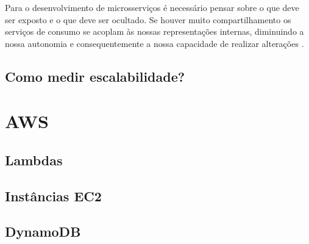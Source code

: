 Para o desenvolvimento de microsserviços é necessário pensar sobre o que deve ser
exposto e o que deve ser ocultado. Se houver muito compartilhamento os serviços de
consumo se acoplam às nossas representações internas, diminuindo a nossa autonomia
e consequentemente a nossa capacidade de realizar alterações \cite{Newman2015}.

\subsection{Como medir escalabilidade?}

\section{AWS}
\subsection{Lambdas}
\subsection{Instâncias EC2}
\subsection{DynamoDB}
